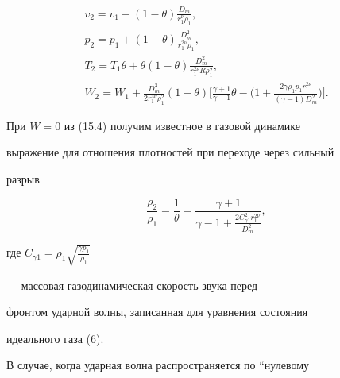 \begin{gather}


v _{2} = v _{1} + (1- \theta) \frac


{D_{m}}{r_{1}^{\nu} \rho_{1}},\tag{15.1}\\


%


p_{2} = p_{1} + (1-\theta) \frac


{D_{m}^{2}}{r_{1}^{2 \nu} \rho_{1}},\tag{15.2}\\


%


T_{2} = T_{1} \theta + \theta (1 - \theta) \frac


{D_{m}^{2}}{r_{1}^{2 \nu} R \rho_{1}^{2}},\tag{15.3}\\


%


W_{2} = W_{1} +\frac {D_{m}^{3}}{2r_{1}^{3 \nu}


\rho_{1}^{2}} (1- \theta) \bigg[\frac {\gamma +1}{\gamma -1} \theta -


\bigg(1+\frac {2\gamma \rho _{1} p_{1} r_{1}^{2 \nu}} {(\gamma - 1)


D_{m}^2}\bigg)\bigg].\tag{15.4}


\end{gather}


\addtocounter{equation}{1}





При $W=0$ из (15.4) получим известное в газовой динамике


выражение для отношения плотностей при переходе через сильный


разрыв


\begin{equation}


\frac {\rho _{2}} {\rho_{1}} = \frac {1}{\theta} =


\frac {\gamma +1}{\gamma - 1 + \frac {2 C_{\gamma 1}^{2} r_{1}^{2


\nu}} {D_{m}^2}},


\end{equation}


где $C_{\gamma 1} = {\rho}_{1} \sqrt {\frac {\gamma p_{1}}{\rho _{1}}}$


--- массовая газодинамическая скорость звука перед


фронтом ударной волны, записанная для уравнения состояния


идеального газа (6).


В случае, когда ударная волна распространяется по ``нулевому


